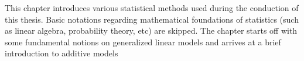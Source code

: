 
This chapter introduces various statistical methods used during the conduction of this thesis. Basic notations regarding mathematical foundations of statistics (such as linear algebra, probability theory, etc) are skipped. The chapter starts off with some fundamental notions on generalized linear models and arrives at a brief introduction to additive models

